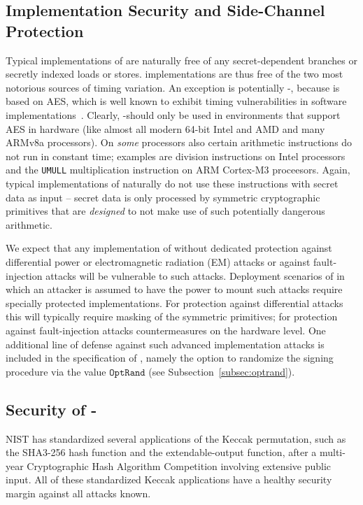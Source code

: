\subsection{Implementation Security and Side-Channel Protection}

Typical implementations of \spx are naturally free of any secret-dependent
branches or secretly indexed loads or stores. \spx implementations are thus
free of the two most notorious sources of timing variation.
An exception is potentially \spx-\haraka, because \haraka is
based on AES, which is well known to exhibit timing vulnerabilities
in software implementations~\cite{Ber04,OST06,BM06,NS07}. Clearly, \spx-\haraka should
only be used in environments that support AES in hardware
(like almost all modern 64-bit Intel and AMD and many ARMv8a processors).
On \emph{some} processors also certain arithmetic instructions do not
run in constant time; examples are division instructions on Intel processors
and the \verb_UMULL_ multiplication instruction on ARM Cortex-M3 proceesors.
Again, typical implementations of \spx naturally do not use these instructions
with secret data as input -- secret data is only processed
by symmetric cryptographic primitives that are \emph{designed}
to not make use of such potentially dangerous arithmetic.

We expect that any implementation of \spx without dedicated protection
against differential power or electromagnetic radiation (EM) attacks
or against fault-injection attacks will be vulnerable to such attacks.
Deployment scenarios of \spx in which an attacker is assumed to have the power
to mount such attacks require specially protected implementations.
For protection against differential attacks this will typically require
masking of the symmetric primitives;
for protection against fault-injection attacks countermeasures on the hardware level.
One additional line of defense against such advanced implementation attacks
is included in the specification of \spx, namely the option to randomize
the signing procedure via the value $\texttt{OptRand}$
(see Subsection~\ref{subsec:optrand}).


\subsection{Security of \spx-\shathree}
NIST has standardized several applications of the Keccak permutation,
such as the SHA3-256 hash function and the \shaketfs extendable-output function,
after a multi-year Cryptographic Hash Algorithm Competition
involving extensive public input.
All of these standardized Keccak applications
have a healthy security margin against all attacks known.


